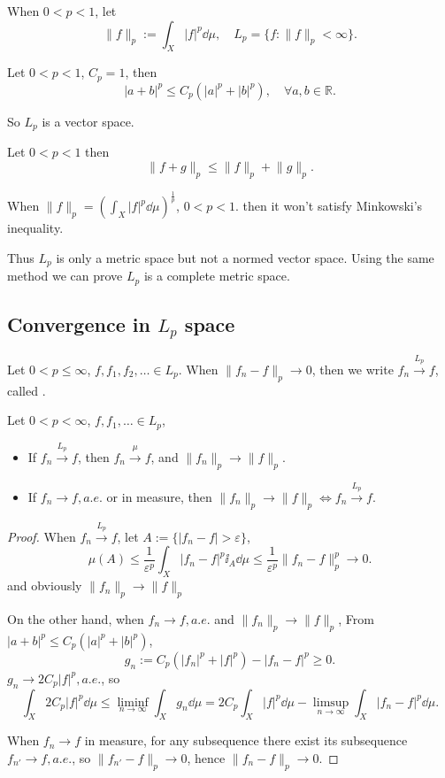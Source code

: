 When $0< p <1$, let
\[
\lVert f \rVert _p := \int_X |f|^p\dd\mu, \quad
L_p = \{f: \lVert f \rVert _p < \infty\}.
\]
\begin{lemma}
	Let $0<p<1$, $C_p = 1$, then
	\[
	|a+b|^p \le C_p(|a|^p + |b|^p), \quad \forall a,b\in \mathbb{R}.
	\]
\end{lemma}
So $L_p$ is a vector space.
\begin{theorem}[Minkowski]
    Let $0<p<1$ then
	\[
	\lVert f+g \rVert _p \le \lVert f \rVert _p + \lVert g \rVert _p.
	\]
\end{theorem}
\begin{remark}
    When $ \lVert f \rVert _p = (\int_X |f|^p \dd \mu) ^{\frac{1}{p}}$, $0<p<1$.
	then it won't satisfy Minkowski's inequality.
\end{remark}
Thus $L_p$ is only a metric space but not a normed vector space.
Using the same method we can prove $L_p$ is a complete metric space.

\subsection{Convergence in $L_p$ space}
\label{sub:Convergence in $L_p$ space}
\begin{definition}
	Let $0<p\le \infty$, $f,f_1,f_2,\dots\in L_p$.
	When $ \lVert f_n - f \rVert _p \to 0$, then we write $f_n \xrightarrow{L_p} f$,
	called .
\end{definition}

\begin{theorem}
    Let $0<p<\infty$, $f,f_1,\dots\in L_p$,
	\begin{itemize}
		\item If $f_n \xrightarrow{L_p} f$, then $f_n\xrightarrow{\mu} f$,
			and $ \lVert f_n \rVert _p\to \lVert f \rVert _p$.
		\item If $f_n\to f, a.e.$ or in measure, then
			$ \lVert f_n \rVert _p\to \lVert f \rVert _p\iff f_n\xrightarrow{L_p} f$.
	\end{itemize}
\end{theorem}
\begin{proof}[Proof]
	When $f_n \xrightarrow{L_p} f$,
    let $A:=\{|f_n - f|>\varepsilon\}$,
	\[
	\mu(A) \le \frac{1}{\varepsilon^p} \int_X |f_n - f|^p \ii_A \dd\mu
	\le \frac{1}{\varepsilon^p}\lVert f_n - f \rVert _p^p \to 0.
	\]
	and obviously $ \lVert f_n \rVert _p\to \lVert f \rVert _p$

	On the other hand, when $f_n \to f,a.e.$ and $ \lVert f_n \rVert _p
	\to \lVert f \rVert _p$,
	From $|a+b|^p \le C_p (|a|^p + |b|^p)$,
	\[
	g_n := C_p (|f_n|^p + |f|^p) - |f_n - f|^p\ge 0.
	\]
	$g_n \to 2C_p |f|^p, a.e.$, so
	\[
	\int_X 2C_p|f|^p \dd \mu \le \liminf_{n\to \infty}\int_X g_n\dd \mu
	= 2C_p \int_X |f|^p\dd\mu - \limsup_{n \to \infty} \int_X|f_n - f|^p\dd\mu.
	\]

	When $f_n \to f$ in measure, for any subsequence there exist its subsequence
	$f_{n'} \to f, a.e.$, so $ \lVert f_{n'}-f \rVert _p \to 0$,
	hence $ \lVert f_n - f \rVert _p \to 0$.
\end{proof}
